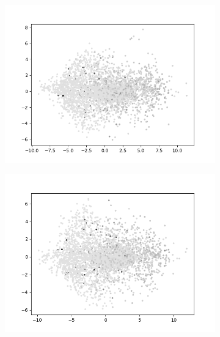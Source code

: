 \begin{figure}[H]
\begin{subfigure}{.25\textwidth}
        \includegraphics[width=\textwidth]{images/figures/experiments_latent/convolutional_dim128_PCA_dsm.png}
    \end{subfigure}%
    \begin{subfigure}{.25\textwidth}
        \centering
        \includegraphics[width=\textwidth]{images/figures/experiments_latent/convolutional_dim50_PCA_dsm.png}
    \end{subfigure}
    \begin{subfigure}{.25\textwidth}
        \centering

\end{subfigure}
\end{figure}
